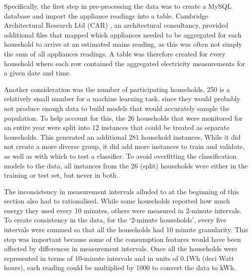 Specifically, the first step in pre-processing the data was to create a MySQL database and import the appliance readings into a table. Cambridge Architectural Research Ltd (CAR) \cite{CARG_1} , an architectural consultancy, provided additional files that mapped which appliances needed to be aggregated for each household to arrive at an estimated mains reading, as this was often not simply the sum of all appliances readings. A table was therefore created for every household where each row contained the aggregated electricity measurements for a given date and time. 

Another consideration was the number of participating households.  250 is a relatively small number for a machine learning task, since they would probably not produce enough data to build models that would  accurately sample the population. To help account for this, the 26 households that were monitored for an entire year were split into 12 instances that could be treated as separate households.  This generated an additional 281 household instances. While it did not create a more diverse group, it did add more instances to train and validate, as well as with which to test a classifier. To avoid overfitting the classification models to the data, all instances from the 26 (split) households were either in the training or test set, but never in both.

The inconsistency in measurement intervals alluded to at the beginning of this section also had to rationalised. While some households reported how much energy they used every 10 minutes, others were measured in 2-minute intervals. To create consistency in the data, for the `2-minute households', every five intervals were summed so that all the households had 10 minute granularity. This step was important because some of the consumption features would have been affected by differences in measurement intervals. Once all the households were represented in terms of 10-minute intervals and in units of 0.1Wh (deci Watt hours), each reading could be multiplied by 1000 to convert the data to kWh.

